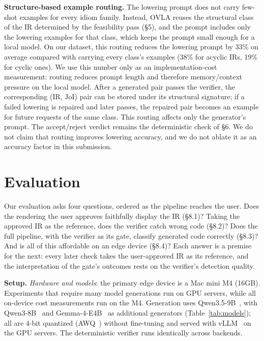 \documentclass[sigconf,nonacm,anonymous,review]{acmart}
\begin{document}
\textbf{Structure-based example routing.} The lowering prompt does not carry few-shot examples for every idiom family. Instead, OVLA reuses the structural class of the IR determined by the feasibility pass (\S5), and the prompt includes only the lowering examples for that class, which keeps the prompt small enough for a local model. On our dataset, this routing reduces the lowering prompt by 33\% on average compared with carrying every class's examples (38\% for acyclic IRs, 19\% for cyclic ones). We use this number only as an implementation-cost measurement: routing reduces prompt length and therefore memory/context pressure on the local model. After a generated pair passes the verifier, the corresponding (IR, JoI) pair can be stored under its structural signature; if a failed lowering is repaired and later passes, the repaired pair becomes an example for future requests of the same class. This routing affects only the generator's prompt. The accept/reject verdict remains the deterministic check of \S6. We do not claim that routing improves lowering accuracy, and we do not ablate it as an accuracy factor in this submission.

\section{Evaluation}

Our evaluation asks four questions, ordered as the pipeline reaches the user. Does the rendering the user approves faithfully display the IR (\S8.1)? Taking the approved IR as the reference, does the verifier catch wrong code (\S8.2)? Does the full pipeline, with the verifier as its gate, classify generated code correctly (\S8.3)? And is all of this affordable on an edge device (\S8.4)? Each answer is a premise for the next: every later check takes the user-approved IR as its reference, and the interpretation of the gate's outcomes rests on the verifier's detection quality.

\textbf{Setup.} \emph{Hardware and models}: the primary edge device is a Mac mini M4 (16GB). Experiments that require many model generations run on GPU servers, while all on-device cost measurements run on the M4. Generation uses Qwen3.5-9B~\cite{qwen35}, with Qwen3-8B~\cite{qwen3} and Gemma-4-E4B~\cite{gemma4} as additional generators (Table~\ref{tab:models}); all are 4-bit quantized (AWQ~\cite{awq}) without fine-tuning and served with vLLM~\cite{vllm} on the GPU servers. The deterministic verifier runs identically across backends.
\end{document}
